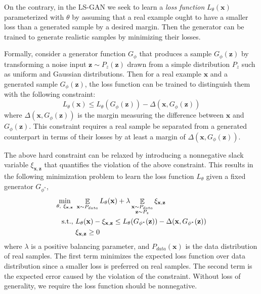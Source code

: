 
On the contrary, in the LS-GAN we seek to learn a {\em loss function} $L_\theta(\mathbf x)$ parameterized with $\theta$ by assuming that a real example ought to have a smaller loss than a generated sample by a desired margin. Then the generator
can be trained to generate realistic samples by minimizing their losses.

Formally, consider a generator function $G_\phi$ that produces a sample  $G_\phi(\mathbf z)$ by transforming a noise input $\mathbf z\sim P_z(\mathbf z)$ drawn from a simple distribution $P_z$ such as uniform and Gaussian distributions.
Then for
a real example $\mathbf x$ and a generated sample $G_\phi(\mathbf z)$, the loss function can be trained to distinguish them with the following constraint:
\begin{equation}\label{eq:ls}
L_\theta(\mathbf x) \leq L_\theta(G_\phi(\mathbf z))- \Delta(\mathbf x,G_\phi(\mathbf z))
\end{equation}
where $\Delta(\mathbf x,G_\phi(\mathbf z))$ is the margin measuring the difference between $\mathbf x$ and $G_\phi(\mathbf z)$. This constraint requires a real sample be separated from a generated counterpart in terms of their losses by at least a margin of $\Delta(\mathbf x,G_\phi(\mathbf z))$.

The above hard constraint can be relaxed by introducing a nonnegative slack variable $\xi_{\mathbf x,\mathbf z}$
that quantifies the violation of the above constraint. This results in the following minimization problem to learn the loss function $L_\theta$ given a fixed generator $G_{\phi^*}$,
\begin{align}\label{eq:loss}
\min_{\theta,~\xi_{\mathbf x,\mathbf z}} ~&\mathop \mathbb E\limits_{\mathbf x\sim P_{data}} L_\theta(\mathbf x) + \lambda \mathop \mathbb E\limits_{\substack{\mathbf x\sim P_{data} \\ \mathbf z\sim P_z}}\xi_{\mathbf x,\mathbf z}\\
{\rm s.t.,}~ &L_\theta(\mathbf x) - \xi_{\mathbf x,\mathbf z} \leq L_\theta(G_{\phi^*}(\mathbf z)) - \Delta(\mathbf x, G_{\phi^*}(\mathbf z))\nonumber\\
&\xi_{\mathbf x,\mathbf z} \ge 0\nonumber
\end{align}
where $\lambda$ is a positive balancing parameter, and $P_{data}(\mathbf x)$ is the data distribution of real samples.  The first term minimizes the expected loss function over data distribution since a smaller loss is preferred on real samples. The second term is the expected error caused by the violation of the constraint. Without loss of generality, we require the loss function should be nonnegative.



